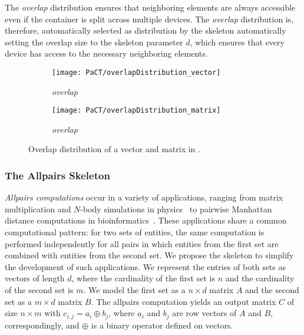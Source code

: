 The \emph{overlap} distribution ensures that neighboring elements are always accessible even if the container is split across multiple devices.
The \emph{overlap} distribution is, therefore, automatically selected as distribution by the \stencil skeleton automatically setting the overlap size to the skeleton parameter $d$, which ensures that every device has access to the necessary neighboring elements.


\begin{figure}[tb]
  \centering
  \begin{subfigure}[b]{.3\textwidth}
    \texttt{[image: PaCT/overlapDistribution\_vector]}
    \caption{\emph{overlap}}
    \label{fig:overlap_distribution:vector}
  \end{subfigure}
  \hspace{3em}
  \begin{subfigure}[b]{.22\textwidth}
    \texttt{[image: PaCT/overlapDistribution\_matrix]}
    \caption{\emph{overlap}}
    \label{fig:overlap_distribution:matrix}
  \end{subfigure}
  \caption{Overlap distribution of a vector and matrix in \SkelCL.}
  \label{fig:overlap_distribution}
  \bigskip
\end{figure}




\subsubsection{The Allpairs Skeleton}
\label{sec:allpairs_skeleton}

\emph{Allpairs computations} occur in a variety of applications, ranging from matrix multiplication and $N$-body simulations in physics~\cite{AroraShVu2009} to pairwise Manhattan distance computations in bioinformatics~\cite{ChangDeQuRo2009}.
These applications share a common computational pattern:
for two sets of entities, the same computation is performed independently for all pairs in which entities from the first set are combined with entities from the second set.
We propose the \allpairs skeleton to simplify the development of such applications.
We represent the entries of both sets as vectors of length $d$, where the cardinality of the first set is $n$ and the cardinality of the second set is $m$.
We model the first set as a $n\times d$ matrix $A$ and the second set as a $m\times d$ matrix $B$.
The allpairs computation yields an output matrix $C$ of size $n\times m$ with $c_{i, j} = a_i \oplus b_j$, where $a_i$ and $b_j$ are row vectors of $A$ and $B$, correspondingly,
and $\oplus$ is a binary operator defined on vectors.

